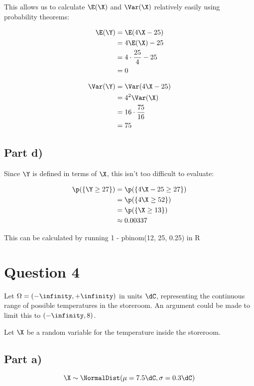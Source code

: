 This allows us to calculate $\E(\X)$ and $\Var(\X)$ relatively easily using probability theorems:

\begin{align*}
\E(\Y) &= \E(4\X - 25) \\
&= 4\E(\X) - 25 \\
&= 4 \cdot \frac{25}{4} - 25 \\
&= 0
\end{align*}

\begin{align*}
\Var(\Y) &= \Var(4\X - 25) \\
&= 4^2 \Var(\X) \\
&= 16 \cdot \frac{75}{16} \\
&= 75
\end{align*}

\subsection*{Part d)}

Since $\Y$ is defined in terms of $\X$, this isn't too difficult to evaluate:

\begin{align*}
\p(\{ \Y \geq 27 \}) &= \p(\{ 4\X - 25 \geq 27 \}) \\
&= \p(\{ 4\X \geq 52\}) \\
&= \p(\{ \X \geq 13 \}) \\
&\approx 0.00337
\end{align*}

This can be calculated by running 1 - pbinom(12, 25, 0.25) in R

\newpage

\section*{Question 4}

Let $\Omega = (-\infinity, +\infinity)$ in units $\dC$, representing the continuous range of possible temperatures in the storeroom.
An argument could be made to limit this to $(-\infinity, 8)$.

Let $\X$ be a random variable for the temperature inside the storeroom.

\subsection*{Part a)}

\[
\X \sim \NormalDist (\mu = 7.5\dC, \sigma = 0.3\dC)
\]


